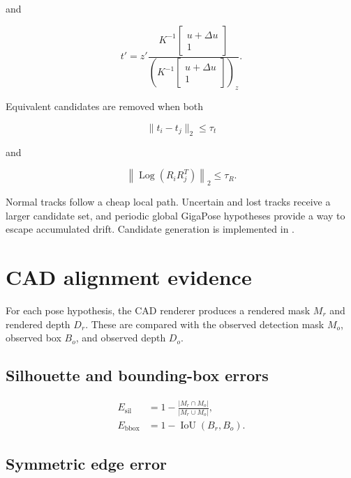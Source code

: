\documentclass[11pt]{article}
\newcommand{\Log}{\operatorname{Log}}
\newcommand{\IoU}{\operatorname{IoU}}
\begin{document}
and

\begin{equation}
t'=z'
\frac{
K^{-1}
\begin{bmatrix}
u+\Delta u\\1
\end{bmatrix}
}{
\left(
K^{-1}
\begin{bmatrix}
u+\Delta u\\1
\end{bmatrix}
\right)_z
}.
\end{equation}

Equivalent candidates are removed when both

\begin{equation}
\lVert t_i-t_j\rVert_2\le\tau_t
\end{equation}

and

\begin{equation}
\left\lVert\Log(R_iR_j^T)\right\rVert_2\le\tau_R.
\end{equation}

Normal tracks follow a cheap local path. Uncertain and lost tracks receive a
larger candidate set, and periodic global GigaPose hypotheses provide a way to
escape accumulated drift. Candidate generation is implemented in
.

\section{CAD alignment evidence}

For each pose hypothesis, the CAD renderer produces a rendered mask $M_r$ and
rendered depth $D_r$. These are compared with the observed detection mask
$M_o$, observed box $B_o$, and observed depth $D_o$.

\subsection{Silhouette and bounding-box errors}

\begin{align}
E_{\mathrm{sil}}&=1-\frac{|M_r\cap M_o|}{|M_r\cup M_o|},\\
E_{\mathrm{bbox}}&=1-\IoU(B_r,B_o).
\end{align}

\subsection{Symmetric edge error}
\end{document}

